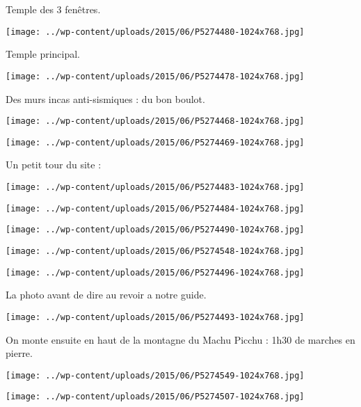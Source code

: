 Temple des 3 fenêtres. 
\begin{center} \texttt{[image: ../wp-content/uploads/2015/06/P5274480-1024x768.jpg]} \end{center}

Temple principal. 
\begin{center} \texttt{[image: ../wp-content/uploads/2015/06/P5274478-1024x768.jpg]} \end{center}
\pagebreak

Des murs incas anti-sismiques : du bon boulot. 
\begin{center} \texttt{[image: ../wp-content/uploads/2015/06/P5274468-1024x768.jpg]} \end{center}
\begin{center} \texttt{[image: ../wp-content/uploads/2015/06/P5274469-1024x768.jpg]} \end{center}
\pagebreak

Un petit tour du site : 
\begin{center} \texttt{[image: ../wp-content/uploads/2015/06/P5274483-1024x768.jpg]} \end{center}
\begin{center} \texttt{[image: ../wp-content/uploads/2015/06/P5274484-1024x768.jpg]} \end{center}

\begin{center} \texttt{[image: ../wp-content/uploads/2015/06/P5274490-1024x768.jpg]} \end{center}
\begin{center} \texttt{[image: ../wp-content/uploads/2015/06/P5274548-1024x768.jpg]} \end{center}

\begin{center} \texttt{[image: ../wp-content/uploads/2015/06/P5274496-1024x768.jpg]} \end{center}

La photo avant de dire au revoir a notre guide. 
\begin{center} \texttt{[image: ../wp-content/uploads/2015/06/P5274493-1024x768.jpg]} \end{center}
\pagebreak

On monte ensuite en haut de la montagne du Machu Picchu : 1h30 de marches en pierre. 
\begin{center} \texttt{[image: ../wp-content/uploads/2015/06/P5274549-1024x768.jpg]} \end{center}
\begin{center} \texttt{[image: ../wp-content/uploads/2015/06/P5274507-1024x768.jpg]} \end{center}
\pagebreak

